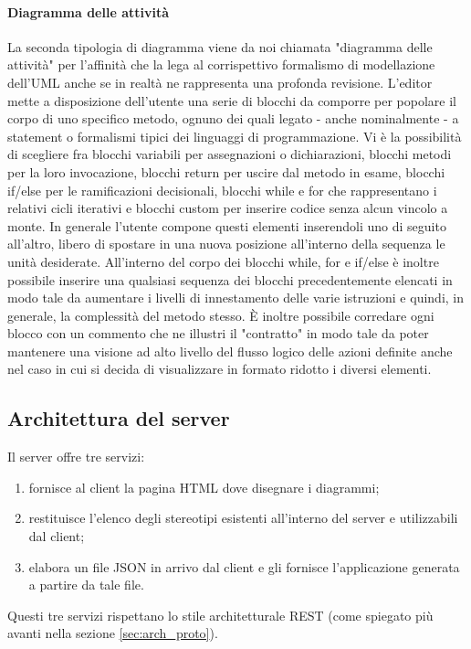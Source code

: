 	\paragraph{Diagramma delle attività}
La seconda tipologia di diagramma viene da noi chiamata "diagramma delle attività" per l'affinità che la lega al corrispettivo formalismo di modellazione dell'UML anche se in realtà ne rappresenta una profonda revisione. L'editor mette a disposizione dell'utente una serie di blocchi da comporre per popolare il corpo di uno specifico metodo, ognuno dei quali legato - anche nominalmente - a statement o formalismi tipici dei linguaggi di programmazione. Vi è la possibilità di scegliere fra blocchi variabili per assegnazioni o dichiarazioni, blocchi metodi per la loro invocazione, blocchi return per uscire dal metodo in esame, blocchi if/else per le ramificazioni decisionali, blocchi while e for che rappresentano i relativi cicli iterativi e blocchi custom per inserire codice senza alcun vincolo a monte.
In generale l'utente compone questi elementi inserendoli uno di seguito all'altro, libero di spostare in una nuova posizione all'interno della sequenza le unità desiderate.
All'interno del corpo dei blocchi while, for e if/else è inoltre possibile inserire una qualsiasi sequenza dei blocchi precedentemente elencati in modo tale da aumentare i livelli di innestamento delle varie istruzioni e quindi, in generale, la complessità del metodo stesso.
È inoltre possibile corredare ogni blocco con un commento che ne illustri il "contratto" in modo tale da poter mantenere una visione ad alto livello del flusso logico delle azioni definite anche nel caso in cui si decida di visualizzare in formato ridotto i diversi elementi.




\subsection{Architettura del server} \label{sec:arch_server}
Il server offre tre servizi:
\begin{enumerate}
	\item fornisce al client la pagina HTML dove disegnare i diagrammi;
	\item restituisce l'elenco degli stereotipi esistenti all'interno del server e utilizzabili dal client;
	\item elabora un file JSON in arrivo dal client e gli fornisce l'applicazione generata a partire da tale file.
\end{enumerate}
Questi tre servizi rispettano lo stile architetturale REST (come spiegato più avanti nella sezione \ref{sec:arch_proto}).


